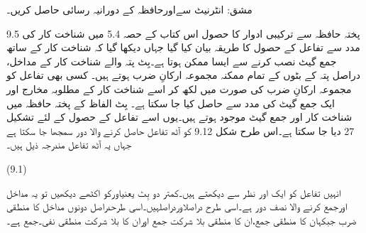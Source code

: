 مشق:	انٹرنیٹ سےاورحافظہ کے دورانیہ رسائی حاصل کریں۔
 
9.5 پختہ حافظہ سے ترکیبی ادوار کا حصول
	اس کتاب کے حصہ 5.4 میں شناخت کار کی مدد سے تفاعل کے حصول کا طریقہ بیان کیا گیا جہاں دیکھا گیا کہ شناخت کار کے ساتھ جمع گیٹ نصب کرنے سے ایسا ممکن ہوتا ہے۔بِٹ پتہ والے شناخت کار کے مداخل، دراصل پتہ کے بٹوں کے تمام ممکنہ مجموعہ ارکانِ ضرب ہوتے ہیں۔  کسی بھی تفاعل کو مجموعہ ارکانِ ضرب کی صورت میں لکھ کر اسے شناخت کار کے مطلوبہ مخارج اور ایک  جمع گیٹ کی مدد سے حاصل کیا جا سکتا ہے۔ 
	بِٹ الفاظ کے پختہ حافظہ میں شناخت کار اور جمع گیٹ موجود ہوتے ہیں۔یوں اسے تفاعل کے حصول کے لئے  تشکیل 27 دیا جا سکتا ہے۔اس طرح شکل 9.12 کو آٹھ تفاعل حاصل کرنے والا دور سمجھا جا سکتا ہے جہاں یہ آٹھ تفاعل مندرجہ ذیل ہیں۔

 
(9.1)

	انہیں تفاعل کو ایک اور نظر سے دیکھتے ہیں۔کمتر دو بِٹ یعنیاورکو اکٹھے دیکھیں تو یہ مداخل  اورجمع کرنے والا نصف دور ہے۔اسی طرح دراصلاوردراصلہیں۔اسی طرحدراصل دونوں مداخل کا منطقی ضرب جبکہان کا منطقی جمع،ان کا منطقی بلا شرکت جمع اوران کا بلا شرکت منطقی نفی۔جمع ہے۔
